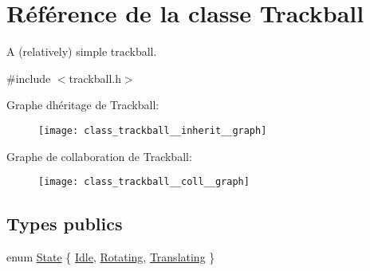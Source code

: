 \hypertarget{class_trackball}{}\section{Référence de la classe Trackball}
\label{class_trackball}


A (relatively) simple trackball.  




{\ttfamily \#include $<$trackball.\+h$>$}



Graphe d\textquotesingle{}héritage de Trackball\+:\nopagebreak
\begin{figure}[H]
\begin{center}
\leavevmode
\texttt{[image: class\_trackball\_\_inherit\_\_graph]}
\end{center}
\end{figure}


Graphe de collaboration de Trackball\+:\nopagebreak
\begin{figure}[H]
\begin{center}
\leavevmode
\texttt{[image: class\_trackball\_\_coll\_\_graph]}
\end{center}
\end{figure}
\subsection*{Types publics}
\begin{DoxyCompactItemize}
\item 
enum \hyperlink{class_trackball_a102216413a87cb37801044063a1b05be}{State} \{ \hyperlink{class_trackball_a102216413a87cb37801044063a1b05bea88bef1e83c8258b076d64eff20ca5e5e}{Idle}, 
\hyperlink{class_trackball_a102216413a87cb37801044063a1b05bea50dbabb8cff2af19785a0d60f981a350}{Rotating}, 
\hyperlink{class_trackball_a102216413a87cb37801044063a1b05bea8a733b5b2990e439a541b6615351d382}{Translating}
 \}
\end{DoxyCompactItemize}
